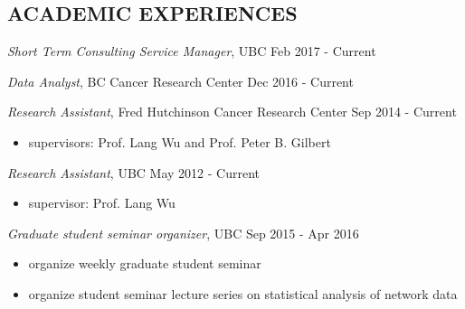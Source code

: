 \documentclass[margin]{res}
\begin{document}
\begin{resume}
 

 
\section{ACADEMIC EXPERIENCES} 

{\sl Short Term Consulting Service Manager}, UBC \hfill Feb 2017 - Current

{\sl Data Analyst}, BC Cancer Research Center
                 \hfill Dec 2016 - Current 
                

{\sl Research Assistant}, Fred Hutchinson Cancer Research Center 
                 \hfill Sep 2014 - Current 
                 \begin{itemize}  \itemsep -2pt %
                 \item supervisors: Prof. Lang Wu and Prof. Peter B. Gilbert
                \end{itemize}

{\sl Research Assistant}, UBC \hfill May 2012 - Current 
                 \begin{itemize}  \itemsep -2pt %
                 \item supervisor: Prof. Lang Wu
                \end{itemize}


{\sl Graduate student seminar organizer}, UBC \hfill Sep 2015 - Apr 2016
                 \begin{itemize}  \itemsep -2pt %
                  \item organize weekly graduate student seminar
                 \item organize student seminar lecture series on statistical
                 analysis of network data
                \end{itemize}                



\end{resume}
\end{document}
